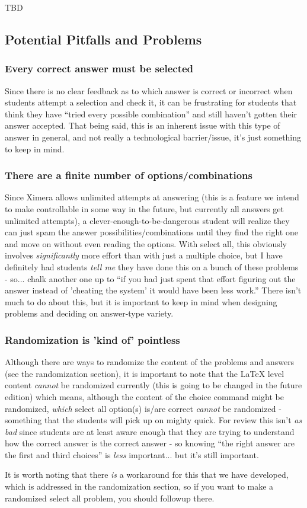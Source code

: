 \documentclass{ximera}
\begin{document}
        TBD
        
    \subsection*{Potential Pitfalls and Problems}
        
        \subsubsection*{Every correct answer must be selected}
            Since there is no clear feedback as to which answer is correct or incorrect when students attempt a selection and check it, it can be frustrating for students that think they have ``tried every possible combination'' and still haven't gotten their answer accepted. That being said, this is an inherent issue with this type of answer in general, and not really a technological barrier/issue, it's just something to keep in mind.
            
        \subsubsection*{There are a finite number of options/combinations}
            Since Ximera allows unlimited attempts at answering (this is a feature we intend to make controllable in some way in the future, but currently all answers get unlimited attempts), a clever-enough-to-be-dangerous student will realize they can just spam the answer possibilities/combinations until they find the right one and move on without even reading the options. With select all, this obviously involves \textit{significantly} more effort than with just a multiple choice, but I have definitely had students \textit{tell me} they have done this on a bunch of these problems - so... chalk another one up to ``if you had just spent that effort figuring out the answer instead of 'cheating the system' it would have been less work.'' There isn't much to do about this, but it is important to keep in mind when designing problems and deciding on answer-type variety.
            
        \subsubsection*{Randomization is 'kind of' pointless}
            Although there are ways to randomize the content of the problems and answers (see the randomization section), it is important to note that the LaTeX level content \textit{cannot} be randomized currently (this is going to be changed in the future edition) which means, although the content of the choice command might be randomized, \textit{which} select all option(s) is/are correct \textit{cannot} be randomized - something that the students will pick up on mighty quick. For review this isn't \textit{as bad} since students are at least aware enough that they are trying to understand how the correct answer is the correct answer - so knowing ``the right answer are the first and third choices'' is \textit{less} important... but it's still important.
            
            It is worth noting that there \textit{is} a workaround for this that we have developed, which is addressed in the randomization section, so if you want to make a randomized select all problem, you should followup there.
            
        
\end{document}
